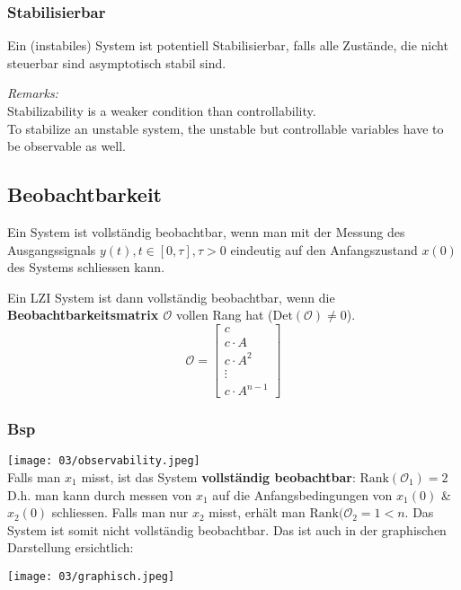         \subsubsection{Stabilisierbar}
            Ein (instabiles) System ist potentiell Stabilisierbar, falls alle Zustände, die nicht steuerbar sind asymptotisch stabil sind.
            
            \textit{Remarks:}
            \\Stabilizability is a weaker condition than controllability.
            \\To stabilize an unstable system, the unstable but controllable variables have to be observable as well.
        \subsection{Beobachtbarkeit}
            Ein System ist vollständig beobachtbar, wenn man mit der Messung des Ausgangssignals $y(t), t \in [0,\tau], \tau > 0$ eindeutig auf den Anfangszustand $x(0)$ des Systems schliessen kann. 
            
            Ein LZI System ist dann vollständig beobachtbar, wenn die \textbf{Beobachtbarkeitsmatrix $\mathcal{O}$} vollen Rang hat ($\textrm{Det}(\mathcal{O})\neq0$).
            \[ \mathcal{O} = \begin{bmatrix} c \\ c \cdot A \\ c \cdot A^2 \\ \vdots \\ c \cdot A^{n-1}\end{bmatrix}\]
            
            \subsubsection{Bsp}
            \texttt{[image: 03/observability.jpeg]}
            \\Falls man $x_1$ misst, ist das System \textbf{vollständig beobachtbar}: $\textrm{Rank}(\mathcal{O}_1)=2$ D.h. man kann durch messen von $x_1$ auf die Anfangsbedingungen von $x_1(0)$ \& $x_2(0)$ schliessen. Falls man nur $x_2$ misst, erhält man $\textrm{Rank}(\mathcal{O}_2=1<n$. Das System ist somit nicht vollständig beobachtbar. Das ist auch in der graphischen Darstellung ersichtlich:
            \begin{center}
                \texttt{[image: 03/graphisch.jpeg]}
            \end{center}
